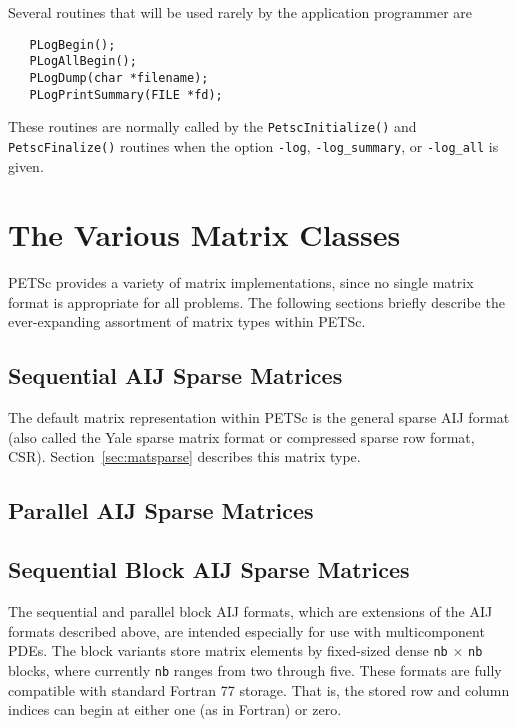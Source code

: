 Several routines that will be used rarely by the 
application programmer 
are    
\begin{verbatim}
   PLogBegin();
   PLogAllBegin();
   PLogDump(char *filename);
   PLogPrintSummary(FILE *fd);
\end{verbatim}
These routines are normally called by the {\tt PetscInitialize()}
and {\tt PetscFinalize()} routines when the option {\tt -log}, 
{\tt -log\_summary}, or 
{\tt -log\_all} is given.

\section{The Various Matrix Classes}
\label{sec:matclasses}

PETSc provides a variety of matrix implementations, since no single
matrix format is appropriate for all problems. The following sections
briefly describe the ever-expanding assortment of matrix types within PETSc.

\subsection{Sequential AIJ Sparse Matrices}

The default matrix representation within PETSc is the general sparse
AIJ format (also called the Yale sparse matrix format or compressed
sparse row format, CSR). Section~\ref{sec:matsparse} describes this
matrix type.

\subsection{Parallel AIJ Sparse Matrices}

%
%

\subsection{Sequential Block AIJ Sparse Matrices}

The sequential and parallel block AIJ formats, which are extensions of
the AIJ formats described above, are intended especially for use with
multicomponent PDEs.  The block variants store matrix elements by
fixed-sized dense {\tt nb} $\times$ {\tt nb} blocks, where currently
{\tt nb} ranges from two through five.  These formats are fully
compatible with standard Fortran 77 storage.  That is, the stored row
and column indices can begin at either one (as in Fortran) or zero.

